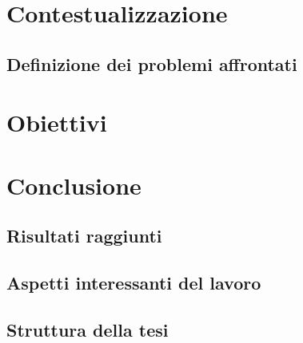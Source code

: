 \section{Contestualizzazione}
	
%	
	 
	\subsection{Definizione dei problemi affrontati}
	

\section{Obiettivi}


\section{Conclusione}
	
	\subsection{Risultati raggiunti}
	
		
	\subsection{Aspetti interessanti del lavoro}
	
	
	\subsection{Struttura della tesi}
	
